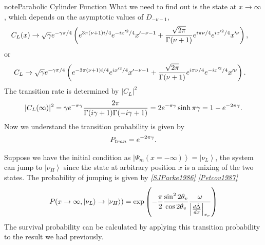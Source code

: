 \documentclass[letterpaper,12pt,english]{sphinxmanual}
\newcommand{\ket}[1]{\left| #1\right\rangle}
\begin{document}
\begin{notice}{note}{Parabolic Cylinder Function}
What we need to find out is the state at \(x\to \infty\), which depends on the asymptotic values of \(D_{-\nu-1}\),
\begin{gather}
\begin{split}C_L(x) &\to \sqrt{\gamma} e^{-\gamma \pi/4} \left(  e^{3\pi (\nu+1)i/4} e^{-ix'^2/4} x'^{-\nu-1} + \frac{\sqrt{2\pi}}{ \Gamma (\nu+1) } e^{i \pi\nu/4} e^{i x'^2 /4} x'^\nu  \right) ,\end{split}\notag
\end{gather}
or
\begin{gather}
\begin{split}C_L & \to \sqrt{\gamma} e^{-\gamma \pi/4} \left(   e^{-3\pi (\nu+1)i/4} e^{ix'^2/4} x'^{-\nu-1} + \frac{\sqrt{2\pi}}{ \Gamma (\nu+1) } e^{i \pi\nu/4} e^{ - i x'^2 /4} x'^\nu   \right).\end{split}\notag
\end{gather}
The transition rate is determined by \(\lvert C_L \rvert^2\)
\begin{gather}
\begin{split}\lvert C_L(\infty) \rvert^2 = \gamma e^{-\pi\gamma} \frac{2\pi}{\Gamma(i\gamma +1) \Gamma(-i\gamma +1)} = 2e^{-\pi\gamma}\sinh \pi\gamma = 1-e^{-2\pi\gamma}.\end{split}\notag
\end{gather}
Now we understand the transition probability is given by
\begin{gather}
\begin{split}P_{tran} = e^{-2\pi\gamma}.\end{split}\notag
\end{gather}\end{notice}

Suppose we have the initial condition as \(\ket{\Psi_m(x=-\infty)} = \ket{\nu_L}\), the system can jump to \(\ket{\nu_H}\) since the state at arbitrary position \(x\) is a mixing of the two states. The probability of jumping is given by \label{msw:id3}{\hyperref[msw:sjparke1986]{\emph{{[}SJParke1986{]}}}} \label{msw:id4}{\hyperref[msw:petcov1987]{\emph{{[}Petcov1987{]}}}}
\begin{gather}
\begin{split}P(x\to \infty, \ket{\nu_L}\to\ket{\nu_H}) = \exp \left( -\frac{\pi}{2}\frac{\sin^2 2\theta_v}{\cos 2\theta_v} \frac{\omega}{\left\vert  \frac{d\hat\Delta}{dx} \right\vert_{x_r} } \right)\end{split}\notag
\end{gather}
The survival probability can be calculated by applying this transition probability to the result we had previously.
\end{document}
